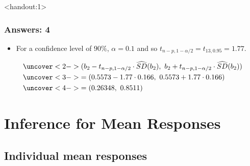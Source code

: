 \documentclass[handout]{beamer}\usepackage[]{graphicx}\usepackage[]{color}
\newcommand{\answers}{1}
\providecommand{\wh}[1]{\widehat{#1}}
\numberwithin{equation}{section}
\begin{document}
\begin{frame}<handout:\answers>
\frametitle{Answers: 4} \small
\begin{itemize}
\item For a confidence level of $90\%$, $\alpha = 0.1$ and so $t_{n - p, 1 - \alpha/2} = t_{13, 0.95} =1.77$.
\end{itemize}
\begin{align*}
&\uncover<2->{(b_2 - t_{n - p, 1 - \alpha/2} \cdot \wh{SD}(b_2), \ b_2 + t_{n - p, 1 - \alpha/2}\cdot \wh{SD}(b_2))} \\
&\uncover<3->{=  (0.5573 - 1.77 \cdot 0.166, \ 0.5573 +1.77 \cdot 0.166)} \\
&\uncover<4->{= (0.26348, \ 0.8511)}
\end{align*}
\begin{itemize}
\end{itemize}
\end{frame}





\section{Inference for Mean Responses}

\subsection{Individual mean responses}
\end{document}
